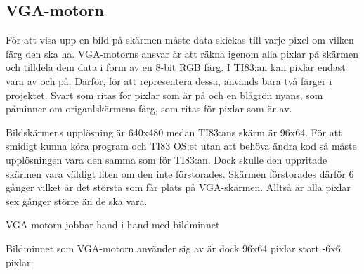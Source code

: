 \documentclass[main.tex]{subfiles}
\begin{document}
\subsection{VGA-motorn}

För att visa upp en bild på skärmen måste data skickas till varje pixel om vilken färg den ska ha. VGA-motorns ansvar är att räkna igenom alla pixlar på skärmen och tilldela dem data i form av en 8-bit RGB färg. I TI83:an kan pixlar endast vara av och på. Därför, för att representera dessa, används bara två färger i projektet. Svart som ritas för pixlar som är på och en blågrön nyans, som påminner om origanlskärmens färg, som ritas för pixlar som är av.

Bildskärmens upplösning är 640x480 medan TI83:ans skärm är 96x64. För att smidigt kunna köra program och TI83 OS:et utan att behöva ändra kod så måste upplösningen vara den samma som för TI83:an. Dock skulle den uppritade skärmen vara väldigt liten om den inte förstorades. Skärmen förstorades därför 6 gånger vilket är det största som får plats på VGA-skärmen. Alltså är alla pixlar sex gånger större än de ska vara. 

VGA-motorn jobbar hand i hand med bildminnet



Bildminnet som VGA-motorn använder sig av är dock 96x64 pixlar stort
-6x6 pixlar
\end{document}
